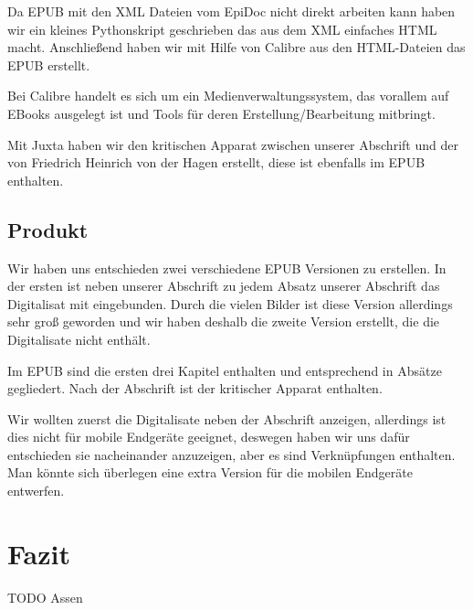 \documentclass[a4paper, 12pt, oneside]{scrbook}
\begin{document}
Da EPUB mit den XML Dateien vom EpiDoc nicht direkt arbeiten kann haben wir ein kleines Pythonskript geschrieben das aus dem XML einfaches HTML macht. Anschließend haben wir mit Hilfe von Calibre aus den HTML-Dateien das EPUB erstellt.

Bei Calibre\cite{calibre} handelt es sich um ein Medienverwaltungssystem, das vorallem auf EBooks ausgelegt ist und Tools für deren Erstellung/Bearbeitung mitbringt.

Mit Juxta\cite{juxta} haben wir den kritischen Apparat zwischen unserer Abschrift und der von  Friedrich Heinrich von der Hagen erstellt, diese ist ebenfalls im EPUB enthalten.
\section{Produkt}
Wir haben uns entschieden zwei verschiedene EPUB Versionen zu erstellen. In der ersten ist neben unserer Abschrift zu jedem Absatz unserer Abschrift das Digitalisat mit eingebunden. Durch die vielen Bilder ist diese Version allerdings sehr groß geworden und wir haben deshalb die zweite Version erstellt, die die Digitalisate nicht enthält.

Im EPUB sind die ersten drei Kapitel enthalten und entsprechend in Absätze gegliedert. Nach der Abschrift ist der kritischer Apparat enthalten.

Wir wollten zuerst die Digitalisate neben der Abschrift anzeigen, allerdings ist dies nicht für mobile Endgeräte geeignet, deswegen haben wir uns dafür entschieden sie nacheinander anzuzeigen, aber es sind Verknüpfungen enthalten. Man könnte sich überlegen eine extra Version für die mobilen Endgeräte entwerfen.

\chapter{Fazit}
TODO Assen

\printbibliography
\end{document}
